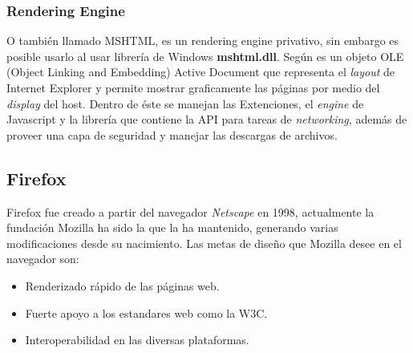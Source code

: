    \subsubsection*{Rendering Engine}   
   \label{chap2:Trident}
   O también llamado MSHTML, es un rendering engine privativo, sin embargo es posible usarlo al usar librería de Windows \textbf{mshtml.dll}. Según \cite{Crowley2010} es un objeto OLE (Object Linking and Embedding) Active Document que representa el \textit{layout} de Internet Explorer y permite mostrar graficamente las páginas por medio del \textit{display} del host. Dentro de éste se manejan las Extenciones, el \textit{engine} de Javascript y la librería que contiene la API para tareas de \textit{networking}, además de proveer una capa de seguridad y manejar las descargas de archivos.







    \subsection{Firefox}
    \label{chap3:Firefox}

    Firefox fue creado a partir del navegador \textit{Netscape} en 1998, actualmente la fundación Mozilla ha sido la que la ha mantenido, generando varias modificaciones desde su nacimiento. Las metas de diseño que Mozilla desee en el navegador son:
    \begin{itemize}
        \item Renderizado rápido de las páginas web.
        \item Fuerte apoyo a los estandares web como la W3C.
        \item Interoperabilidad en las diversas plataformas.
    \end{itemize}


